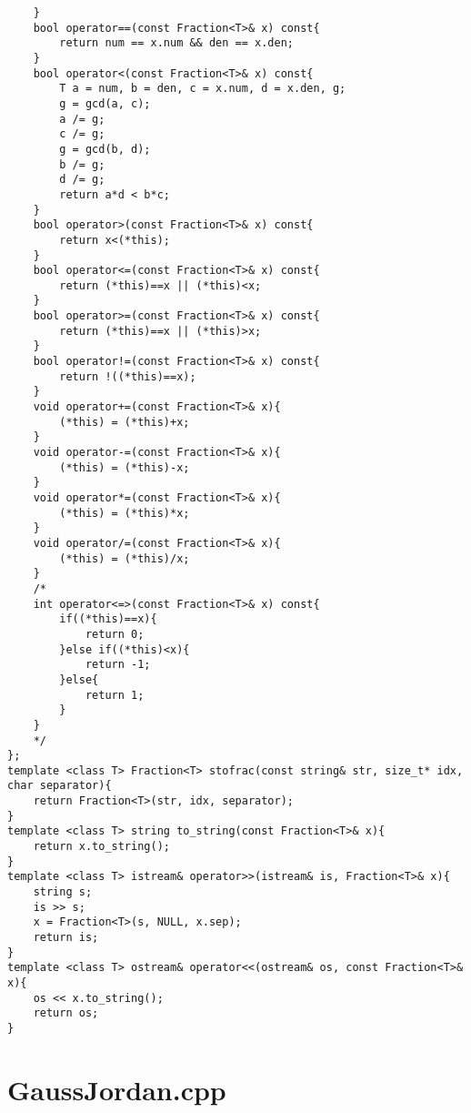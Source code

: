 \documentclass[a4paper,landscape,8pt]{extarticle}
\begin{document}
\begin{multicols}{3}
\begin{lstlisting}
    }
    bool operator==(const Fraction<T>& x) const{
        return num == x.num && den == x.den;
    } 
    bool operator<(const Fraction<T>& x) const{
        T a = num, b = den, c = x.num, d = x.den, g;
        g = gcd(a, c);
        a /= g;
        c /= g;
        g = gcd(b, d);
        b /= g;
        d /= g;
        return a*d < b*c;
    }
    bool operator>(const Fraction<T>& x) const{
        return x<(*this);
    }
    bool operator<=(const Fraction<T>& x) const{
        return (*this)==x || (*this)<x;
    }
    bool operator>=(const Fraction<T>& x) const{
        return (*this)==x || (*this)>x;
    }
    bool operator!=(const Fraction<T>& x) const{
        return !((*this)==x);
    }
    void operator+=(const Fraction<T>& x){
        (*this) = (*this)+x;
    }
    void operator-=(const Fraction<T>& x){
        (*this) = (*this)-x;
    }
    void operator*=(const Fraction<T>& x){
        (*this) = (*this)*x;
    }
    void operator/=(const Fraction<T>& x){
        (*this) = (*this)/x;
    }
    /*
    int operator<=>(const Fraction<T>& x) const{
        if((*this)==x){
            return 0;
        }else if((*this)<x){
            return -1;
        }else{
            return 1;
        }
    }
    */
};
template <class T> Fraction<T> stofrac(const string& str, size_t* idx, char separator){
	return Fraction<T>(str, idx, separator);
}
template <class T> string to_string(const Fraction<T>& x){
	return x.to_string();
}
template <class T> istream& operator>>(istream& is, Fraction<T>& x){
	string s;
	is >> s;
	x = Fraction<T>(s, NULL, x.sep);
    return is;
}
template <class T> ostream& operator<<(ostream& os, const Fraction<T>& x){
	os << x.to_string();
	return os;
}
\end{lstlisting}

\section*{GaussJordan.cpp}


\end{multicols}
\end{document}
